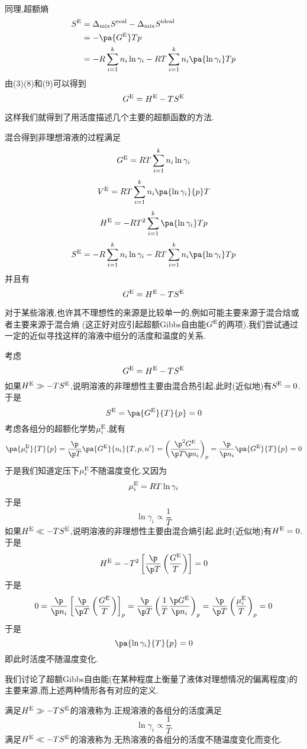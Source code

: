 \documentclass{ctexart}
\begin{document}
\begin{derivation}
\begin{equation}
\begin{aligned}
        \end{aligned}
    \end{equation}
    同理,超额熵
    \begin{equation}
        \begin{aligned}
            S^{\text E}
            &= \Delta_{\text{mix}}S^{\text{real}}-\Delta_{\text{mix}}S^{\text{ideal}} \\
            &= -\pa{G^\text E}Tp \\
            &= -R\sum_{i=1}^{k}n_i\ln\gamma_i-RT\sum_{i=1}^{k}n_i\pa{\ln\gamma_i}Tp
        \end{aligned}
    \end{equation}
    由(3)(8)和(9)可以得到
    \[G^\text E=H^\text E-TS^\text E\]
    
\end{derivation}
这样我们就得到了用活度描述几个主要的超额函数的方法.
\begin{theorem}[4C.6.5 混合得到非理想溶液的热力学函数变化]
    混合得到非理想溶液的过程满足
    \[G^\text E=RT\sum_{i=1}^{k}n_i\ln\gamma_i\]
    \[V^\text E=RT\sum_{i=1}^{k}n_i\pa{\ln\gamma_i}{p}T\]
    \[H^\text E=-RT^2\sum_{i=1}^{k}\pa{\ln\gamma_i}Tp\]
    \[S^\text E=-R\sum_{i=1}^{k}n_i\ln\gamma_i-RT\sum_{i=1}^{k}n_i\pa{\ln\gamma_i}Tp\]
    并且有
    \[G^\text E=H^\text E-TS^\text E\]

\end{theorem}
对于某些溶液,也许其不理想性的来源是比较单一的,例如可能主要来源于混合焓或者主要来源于混合熵%
(这正好对应引起超额Gibbs自由能$G^\text E$的两项).我们尝试通过一定的近似寻找这样的溶液中组分的活度和温度的关系.
\begin{derivation}
    考虑
    \[G^\text E=H^\text E-TS^\text E\]
    如果$H^\text E\gg-TS^\text E$,说明溶液的非理想性主要由混合热引起.此时(近似地)有$S^\text E=0$.于是
    \[S^\text E=\pa{G^\text E}{T}{p}=0\]
    考虑各组分的超额化学势$\mu_i^\text E$,就有
    \[\pa{\mu_i^\text E}{T}{p}=\dfrac{\p}{\p T}\pa{G^\text E}{n_i}{T,p,n'}
    =\left(\dfrac{\p^2 G^\text E}{\p T\p n_i}\right)_p=\dfrac{\p}{\p n_i}\pa{G^\text E}{T}{p}=0\]
    于是我们知道定压下$\mu_i^\text E$不随温度变化.又因为
    \[\mu_i^\text E=RT\ln\gamma_i\]
    于是
    \[\ln\gamma_i\propto\dfrac{1}{T}\]
    如果$H^\text E\ll-TS^\text E$,说明溶液的非理想性主要由混合熵引起.此时(近似地)有$H^\text E=0$.于是
    \[H^\text E=-T^2\left[\dfrac{\p}{\p T}\left(\dfrac{G^\text E}{T}\right)\right]=0\]
    于是
    \[0=\dfrac{\p}{\p n_i}\left[\dfrac{\p}{\p T}\left(\dfrac{G^\text E}{T}\right)\right]_p
    =\dfrac{\p}{\p T}\left(\dfrac{1}{T}\dfrac{\p G^\text E}{\p n_i}\right)_p=\dfrac{\p}{\p T}\left(\dfrac{\mu_i^\text E}{T}\right)_p=0\]
    于是
    \[\pa{\ln\gamma_i}{T}{p}=0\]
    即此时活度不随温度变化.
\end{derivation}
我们讨论了超额Gibbs自由能(在某种程度上衡量了液体对理想情况的偏离程度)的主要来源,而上述两种情形各有对应的定义.
\begin{definition}[4C.6.6 正规溶液和无热溶液]
    满足$H^\text E\gg-TS^\text E$的溶液称为.正规溶液的各组分的活度满足
    \[\ln\gamma_i\propto\dfrac{1}{T}\]
    满足$H^\text E\ll-TS^\text E$的溶液称为.无热溶液的各组分的活度不随温度变化而变化.
\end{definition}
\end{document}
